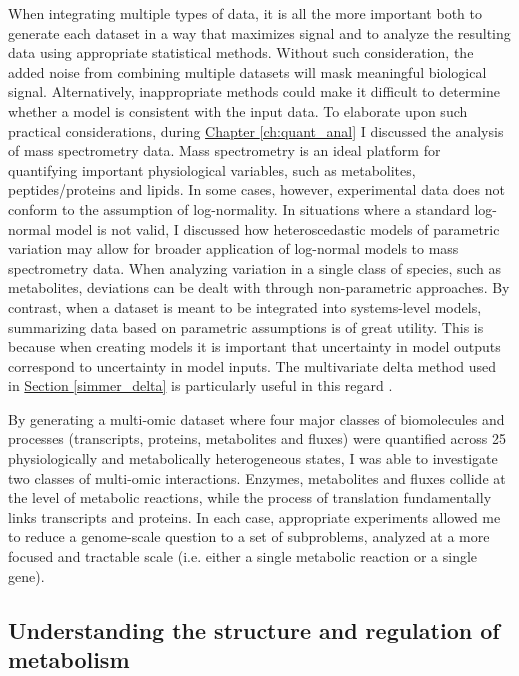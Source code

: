 When integrating multiple types of data, it is all the more important both to generate each dataset in a way that maximizes signal and to analyze the resulting data using appropriate statistical methods. Without such consideration, the added noise from combining multiple datasets will mask meaningful biological signal. Alternatively, inappropriate methods could make it difficult to determine whether a model is consistent with the input data. To elaborate upon such practical considerations, during \hyperref[ch:quant_anal]{Chapter \ref{ch:quant_anal}} I discussed the analysis of mass spectrometry data.  Mass spectrometry is an ideal platform for quantifying important physiological variables, such as metabolites, peptides/proteins and lipids. In some cases, however, experimental data does not conform to the assumption of log-normality. In situations where a standard log-normal model is not valid, I discussed how heteroscedastic models of parametric variation may allow for broader application of log-normal models to mass spectrometry data. When analyzing variation in a single class of species, such as metabolites, deviations can be dealt with through non-parametric approaches. By contrast, when a dataset is meant to be integrated into systems-level models, summarizing data based on parametric assumptions is of great utility.  This is because when creating models it is important that uncertainty in model outputs correspond to uncertainty in model inputs. The multivariate delta method used in \hyperref[simmer_delta]{Section \ref{simmer_delta}} is particularly useful in this regard \cite{Lynch:1998vx}.

By generating a multi-omic dataset where four major classes of biomolecules and processes (transcripts, proteins, metabolites and fluxes) were quantified across 25 physiologically and metabolically heterogeneous states, I was able to investigate two classes of multi-omic interactions. Enzymes, metabolites and fluxes collide at the level of metabolic reactions, while the process of translation fundamentally links transcripts and proteins. In each case, appropriate experiments allowed me to reduce a genome-scale question to a set of subproblems, analyzed at a more focused and tractable scale (i.e. either a single metabolic reaction or a single gene).

\subsection{Understanding the structure and regulation of metabolism}

